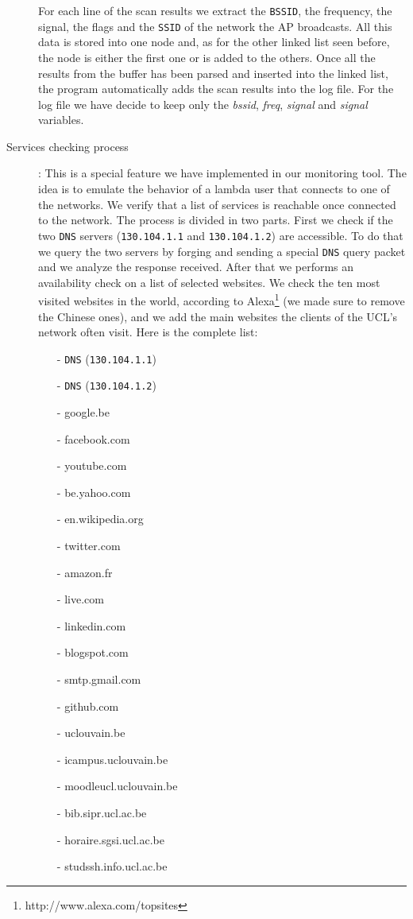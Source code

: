 \begin{description}
	For each line of the scan results we extract the \texttt{BSSID}, the frequency, the signal, the flags and the \texttt{SSID} of the network the AP broadcasts. All this data is stored into one node and, as for the other linked list seen before, the node is either the first one or is added to the others. Once all the results from the buffer has been parsed and inserted into the linked list, the program automatically adds the scan results into the log file. For the log file we have decide to keep only the \textit{bssid}, \textit{freq}, \textit{signal} and \textit{signal} variables.

	\item[Services checking process]: This is a special feature we have implemented in our monitoring tool. The idea is to emulate the behavior of a lambda user that connects to one of the networks. We verify that a list of services is reachable once connected to the network. The process is divided in two parts. First we check if the two \texttt{DNS} servers (\texttt{130.104.1.1} and \texttt{130.104.1.2}) are accessible. To do that we query the two servers by forging and sending a special \texttt{DNS} query packet and we analyze the response received. After that we performs an availability check on a list of selected websites. We check the ten most visited websites in the world, according to Alexa\footnote{http://www.alexa.com/topsites} (we made sure to remove the Chinese ones), and we add the main websites the clients of the UCL's network often visit. Here is the complete list:
	\begin{itemize}
		\item[-] \texttt{DNS} (\texttt{130.104.1.1})
		\item[-] \texttt{DNS} (\texttt{130.104.1.2})
		\item[-] google.be
		\item[-] facebook.com
		\item[-] youtube.com
		\item[-] be.yahoo.com
		\item[-] en.wikipedia.org
		\item[-] twitter.com
		\item[-] amazon.fr
		\item[-] live.com
		\item[-] linkedin.com
		\item[-] blogspot.com
		\item[-] smtp.gmail.com
		\item[-] github.com
		\item[-] uclouvain.be
		\item[-] icampus.uclouvain.be
		\item[-] moodleucl.uclouvain.be
		\item[-] bib.sipr.ucl.ac.be
		\item[-] horaire.sgsi.ucl.ac.be
		\item[-] studssh.info.ucl.ac.be
	\end{itemize}


\end{description}
